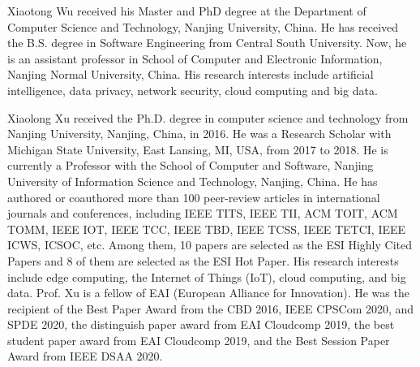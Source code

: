 \documentclass[journal,transmag,11pt]{IEEEtran}
\begin{document}


% 


\begin{IEEEbiographynophoto}{Xiaotong Wu}
	received his Master and PhD degree at the Department of Computer Science and Technology, Nanjing University, China. He has received the B.S. degree in Software Engineering from Central South University. Now, he is an assistant professor in School of Computer and Electronic Information, Nanjing Normal University, China. His research interests include artificial intelligence, data privacy, network security, cloud computing and big data.
\end{IEEEbiographynophoto}


\begin{IEEEbiographynophoto}{Xiaolong Xu}
	received the Ph.D. degree in computer science and technology from Nanjing University, Nanjing, China, in 2016. He was a Research Scholar with Michigan State University, East Lansing, MI, USA, from 2017 to 2018. He is currently a Professor with the School of Computer and Software, Nanjing University of Information Science and Technology, Nanjing, China. He has authored or coauthored more than 100 peer-review articles in international journals and conferences, including IEEE TITS, IEEE TII, ACM TOIT, ACM TOMM, IEEE IOT, IEEE TCC, IEEE TBD, IEEE TCSS, IEEE TETCI, IEEE ICWS, ICSOC, etc. Among them, 10 papers are selected as the ESI Highly Cited Papers and 8 of them are selected as the ESI Hot Paper. His research interests include edge computing, the Internet of Things (IoT), cloud computing, and big data. Prof. Xu is a fellow of EAI (European Alliance for Innovation). He was the recipient of the Best Paper Award from the CBD 2016, IEEE CPSCom 2020, and SPDE 2020, the distinguish paper award from EAI Cloudcomp 2019, the best student paper award from EAI Cloudcomp 2019, and the Best Session Paper Award from IEEE DSAA 2020.  
\end{IEEEbiographynophoto}
\end{document}
